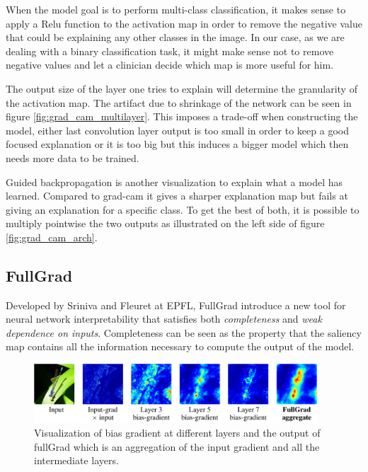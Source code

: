 When the model goal is to perform multi-class classification, it makes sense to apply a Relu function to the activation map in order to remove the negative value that could be explaining any other classes in the image. In our case, as we are dealing with a binary classification task, it might make sense not to remove negative values and let a clinician decide which map is more useful for him.

The output size of the layer one tries to explain will determine the granularity of the activation map. The artifact due to shrinkage of the network can be seen in figure \ref{fig:grad_cam_multilayer}. This imposes a trade-off when constructing the model, either last convolution layer output is too small in order to keep a good focused explanation or it is too big but this induces a bigger model which then needs more data to be trained.

Guided backpropagation\cite{guided_backprop_springenberg2014striving} is another visualization to explain what a model has learned. Compared to grad-cam it gives a sharper explanation map but fails at giving an explanation for a specific class. To get the best of both, it is possible to multiply pointwise the two outputs as illustrated on the left side of figure \ref{fig:grad_cam_arch}.


\subsection{FullGrad}
\label{sec:fullgrad}

Developed by Sriniva and Fleuret at EPFL, FullGrad\cite{fullgradient} introduce a new tool for neural network interpretability that satisfies both \textit{completeness} and \textit{weak dependence on inputs}. Completeness can be seen as the property that the saliency map contains all the information necessary to compute the output of the model.

\begin{figure}
    \centering
    \includegraphics[width=400]{figures/fullgrad_layer_agregation.png}
    \caption[FullGradExample]{Visualization\cite{fullgradient} of bias gradient at different layers and the output of fullGrad which is an aggregation of the input gradient and all the intermediate layers.}
    \label{fig:full_grad_layer_aggreagtion}
\end{figure}

